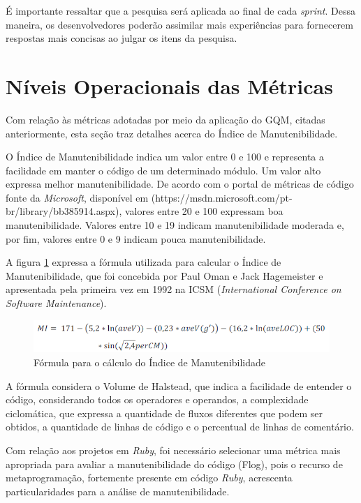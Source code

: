 É importante ressaltar que a pesquisa será aplicada ao final de cada \textit{sprint}. Dessa maneira, os desenvolvedores poderão assimilar mais experiências para fornecerem respostas mais concisas ao julgar os itens da pesquisa.

\section{Níveis Operacionais das Métricas}

Com relação às métricas adotadas por meio da aplicação do GQM, citadas anteriormente, esta seção traz detalhes acerca do Índice de Manutenibilidade.

O Índice de Manutenibilidade indica um valor entre 0 e 100 e representa a facilidade em manter o código de um determinado módulo. Um valor alto expressa melhor manutenibilidade. De acordo com o portal de métricas de código fonte da \textit{Microsoft}, disponível em (https://msdn.microsoft.com/pt-br/library/bb385914.aspx), valores entre 20 e 100 expressam boa manutenibilidade. Valores entre 10 e 19 indicam manutenibilidade moderada e, por fim, valores entre 0 e 9 indicam pouca manutenibilidade.

A figura \ref{fig:formulaManutenibilidade} expressa a fórmula utilizada para calcular o Índice de Manutenibilidade, que foi concebida por Paul Oman e Jack Hagemeister e apresentada pela primeira vez em 1992 na ICSM (\textit{International Conference on Software Maintenance}).

\begin{figure}[h]
\includegraphics[width=\textwidth]{figuras/mi.png}
\caption{Fórmula para o cálculo do Índice de Manutenibilidade}
\label{fig:formulaManutenibilidade}
\end{figure}

A fórmula considera o Volume de Halstead, que indica a facilidade de entender o código, considerando todos os operadores e operandos, a complexidade ciclomática, que expressa a quantidade de fluxos diferentes que podem ser obtidos, a quantidade de linhas de código e o percentual de linhas de comentário.

Com relação aos projetos em \textit{Ruby}, foi necessário selecionar uma métrica mais apropriada para avaliar a manutenibilidade do código (Flog), pois o recurso de metaprogramação, fortemente presente em código \textit{Ruby}, acrescenta particularidades para a análise de manutenibilidade.

